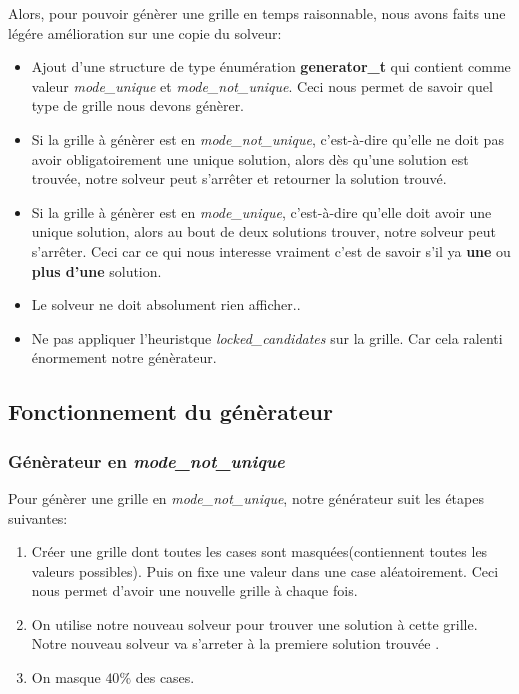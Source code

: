 \documentclass{article}
\begin{document}
\begin{enumerate}
Alors, pour pouvoir génèrer une grille en temps raisonnable, nous avons faits une légére amélioration sur une copie du solveur:
\vspace{0.2cm}
\begin{itemize}
    \item Ajout d'une structure de type énumération \textbf{generator\_t} qui contient comme valeur \textit{mode\_unique} et  \textit{mode\_not\_unique}. Ceci nous permet de savoir quel type de grille nous devons génèrer.\vspace{0.15cm}
    \item Si la grille à génèrer est en \textit{mode\_not\_unique}, c'est-à-dire qu'elle ne doit pas avoir obligatoirement une unique solution, alors dès qu'une solution est trouvée, notre solveur peut s'arrêter et retourner la solution trouvé.\vspace{0.15cm}
    \item Si la grille à génèrer est en \textit{mode\_unique}, c'est-à-dire qu'elle doit avoir une unique solution, alors au bout de deux solutions trouver, notre  solveur peut s'arrêter. Ceci car ce qui nous interesse vraiment c'est de savoir s'il ya \textbf{une} ou \textbf{plus d'une} solution.\vspace{0.15cm}
    \item Le solveur ne doit absolument rien afficher..\vspace{0.15cm}
    \item Ne pas appliquer l'heuristque \textit{locked\_candidates} sur la grille. Car cela ralenti énormement notre génèrateur.
\end{itemize}

\subsection{ Fonctionnement du génèrateur }

  \subsubsection{ Génèrateur en \textit{mode\_not\_unique} }

Pour génèrer une grille en \textit{mode\_not\_unique}, notre générateur suit les étapes suivantes:

\begin{enumerate}
    \item Créer une grille dont toutes les cases sont masquées(contiennent toutes les valeurs possibles). Puis on fixe une valeur dans une case aléatoirement. Ceci nous permet d'avoir une nouvelle grille à chaque fois. \vspace{0.15cm}
    \item On utilise notre nouveau solveur pour trouver une solution à cette grille. Notre nouveau solveur va s'arreter à la premiere solution trouvée .\vspace{0.15cm}
    \item On masque $40\%$ des cases.  \vspace{0.15cm}
\end{enumerate}


\end{enumerate}
\end{document}
